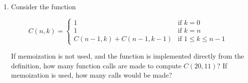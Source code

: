 \documentclass[a4paper,12pt]{article}
\begin{document}
\begin{enumerate}
\item Consider the function

\[
  C(n,k) = \begin{cases} 
              1 & \text{if } k = 0\\
              1 & \text{if } k = n\\
              C(n - 1, k) + C(n - 1, k -1) & \text{if } 1 \leq k \leq n - 1
           \end{cases}
\]

If memoization is not used, and the function is implemented directly from the definition, how many function calls are made to compute $C(20,11)$? If memoization is used, how many calls would be made?

\vspace{5 mm}



\end{enumerate}
\end{document}

